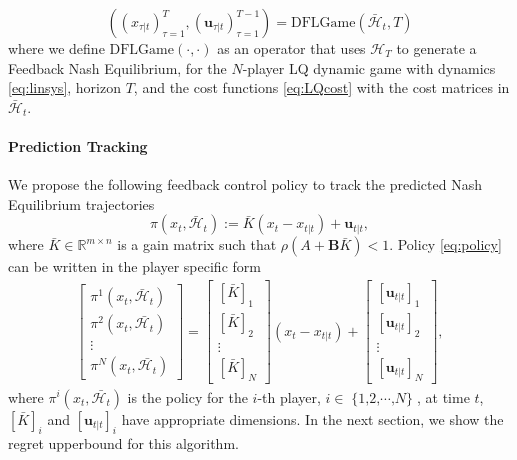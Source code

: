\documentclass[letterpaper, 10 pt, conference]{ieeeconf}  %
\DeclareMathOperator{\Nplayers}{\{1,2,\cdots,\textit{N}\}}
\begin{document}
\begin{equation*}
    ((x_{\tau|t})_{\tau=1}^{T},(\mathbf{u}_{\tau|t})_{\tau=1}^{T-1}) = \text{DFLGame}(\bar{\mathcal{H}}_{t},T)
\end{equation*}
where we define $\text{DFLGame}(\cdot, \cdot)$ as an operator that uses $\mathcal{H}_{T}$ to generate a Feedback Nash Equilibrium, for the $N$-player LQ dynamic game with dynamics \eqref{eq:linsys}, horizon $T$, and the cost functions \eqref{eq:LQcost} with the cost matrices in $\bar{\mathcal{H}}_{t}$.

\paragraph{Prediction Tracking} We propose the following feedback control policy to track the predicted Nash Equilibrium trajectories
\begin{equation}\label{eq:policy}
    \pi(x_{t}, \bar{\mathcal{H}}_{t}) := \bar{K}(x_{t}-x_{t|t}) + \mathbf{u}_{t|t},
\end{equation}
where $\bar{K}\in \mathbb{R}^{m\times n}$ is a gain matrix such that $\rho(A+\mathbf{B}\bar{K}) < 1$. Policy \eqref{eq:policy} can be written in the player specific form
\begin{align*}
\begin{bmatrix}
    \pi^{1}(x_{t}, \bar{\mathcal{H}}_{t})\\
    \pi^{2}(x_{t}, \bar{\mathcal{H}_{t}})\\
    \vdots\\
    \pi^{N}(x_{t}, \bar{\mathcal{H}_{t}})
\end{bmatrix}=
    \begin{bmatrix}
        [\bar{K}]_{1}\\
        [\bar{K}]_{2}\\
        \vdots\\
        [\bar{K}]_{N}
    \end{bmatrix}(x_{t}-x_{t|t}) + 
    \begin{bmatrix}
        [\mathbf{u}_{t|t}]_{1}\\
        [\mathbf{u}_{t|t}]_{2}\\
        \vdots\\
        [\mathbf{u}_{t|t}]_{N}
    \end{bmatrix},
\end{align*}
where $\pi^{i}(x_{t}, \bar{\mathcal{H}_{t}})$ is the policy for the $i$-th player, $i \in \Nplayers$, at time $t$, $[\bar{K}]_{i}$ and $[\mathbf{u}_{t|t}]_{i}$ have appropriate dimensions.
In the next section, we show the regret upperbound for this algorithm.
\end{document}
